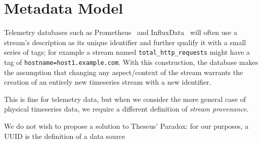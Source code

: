 \section{Metadata Model}

Telemetry databases such as Prometheus~\cite{prometheus} and
InfluxData~\cite{influxdata} will often use a stream's description as its
unique identifier and further qualify it with a small series of tags; for
example a stream named \texttt{total\_http\_requests} might have a tag of
\texttt{hostname=host1.example.com}. With this construction, the database makes
the assumption that changing any aspect/context of the stream warrants the
creation of an entirely new timeseries stream with a new identifier. 

This is fine for telemetry data, but when we consider the more general case of
physical timeseries data, we require a different definition of \emph{stream
provenance}.

We do not wish to propose a solution to Theseus' Paradox: for our purposes, a UUID is the definition of
a data source



